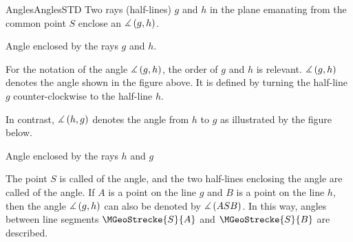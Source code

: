 \begin{MXContent}{Angles}{Angles}{STD}
Two rays (half-lines) $g$ and $h$ in the plane emanating from the common
point $S$ enclose an  $\measuredangle\left(g, h\right)$.

\begin{center}
\par
Angle enclosed by the rays $g$ and $h$.
\end{center}

For the notation of the angle $\measuredangle \left( g, h \right)$, 
the order of $g$ and $h$ is relevant. $\measuredangle \left( g, h \right)$
denotes the angle shown in the figure above. It is defined by
turning the half-line $g$ counter-clockwise to the half-line $h$.

In contrast, $\measuredangle \left( h, g \right)$ denotes the angle from 
$h$ to $g$ as illustrated by the figure below.


\begin{center}
\par
Angle enclosed by the rays $h$ and $g$
\end{center}

The point $S$ is called  of the angle, and 
the two half-lines enclosing the angle are called  of the angle. 
If $A$ is a point on the line $g$ and $B$ is a point on the line $h$, then 
the angle $\measuredangle \left( g, h \right)$ can also be denoted by 
$\measuredangle \left( A S B \right)$. In this way, angles between line segments 
$\MGeoStrecke{S}{A}$ and $\MGeoStrecke{S}{B}$ are described.


\end{MXContent}
